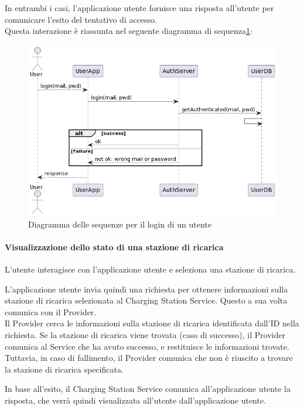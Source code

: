 In entrambi i casi, l'applicazione utente fornisce una risposta all'utente per comunicare
l'esito del tentativo di accesso.\\

Questa interazione è riassunta nel seguente diagramma di sequenza\ref{fig:login}:
\begin{figure}[htbp]
    \centering
    \includegraphics[width=\textwidth]{images/login.png}
    \caption{Diagramma delle sequenze per il login di un utente}
    \label{fig:login}
\end{figure}

\paragraph{Visualizzazione dello stato di una stazione di ricarica}
L'utente interagisce con l'applicazione utente e seleziona una stazione di ricarica.

L'applicazione utente invia quindi una richiesta per ottenere informazioni sulla stazione di
ricarica selezionata al Charging Station Service. Questo a sua volta comunica con il Provider.\\

Il Provider cerca le informazioni sulla stazione di ricarica identificata dall'ID nella richiesta.
Se la stazione di ricarica viene trovata (caso di successo), il Provider comunica al Service che
ha avuto successo, e restituisce le informazioni trovate.\\

Tuttavia, in caso di fallimento, il Provider comunica che non è riuscito a trovare la stazione di
ricarica specificata.

In base all'esito, il Charging Station Service comunica all'applicazione utente la risposta,
che verrà quindi visualizzata all'utente dall'applicazione utente.

